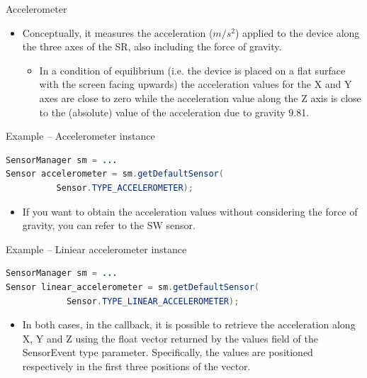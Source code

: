 \documentclass{beamer}
\begin{document}
  \begin{frame}{Accelerometer}
    \begin{itemize}
      \item Conceptually, it measures the acceleration ($m/s^{2}$) applied to
      the device along the three axes of the SR, also including the force of
      gravity.
      \begin{itemize}
        \item In a condition of equilibrium (i.e. the device is placed on a flat
        surface with the screen facing upwards) the acceleration values for the
        X and Y axes are close to zero while the acceleration value along the Z
        axis is close to the (absolute) value of the acceleration due to gravity
        9.81.
      \end{itemize}
    \end{itemize}

    \begin{exampleblock}{Example -- Accelerometer instance}
      \begin{lstlisting}[language=Java]  
SensorManager sm = ...
Sensor accelerometer = sm.getDefaultSensor(
          Sensor.TYPE_ACCELEROMETER);
      \end{lstlisting}
    \end{exampleblock}

    \begin{itemize}
      \item If you want to obtain the acceleration values without considering
      the force of gravity, you can refer to the  SW
      sensor.
    \end{itemize}

    \begin{exampleblock}{Example -- Liniear accelerometer instance}
      \begin{lstlisting}[language=Java]  
SensorManager sm = ...
Sensor linear_accelerometer = sm.getDefaultSensor(
            Sensor.TYPE_LINEAR_ACCELEROMETER);
      \end{lstlisting}
    \end{exampleblock}
    \vspace{10pt}
    \begin{itemize}
      \item In both cases, in the  callback, it is
      possible to retrieve the acceleration  along X, Y and Z
      using the float vector returned by the values field of the SensorEvent
      type parameter. Specifically, the values are positioned respectively in
      the first three positions of the vector.
    \end{itemize}

  \end{frame}
\end{document}
